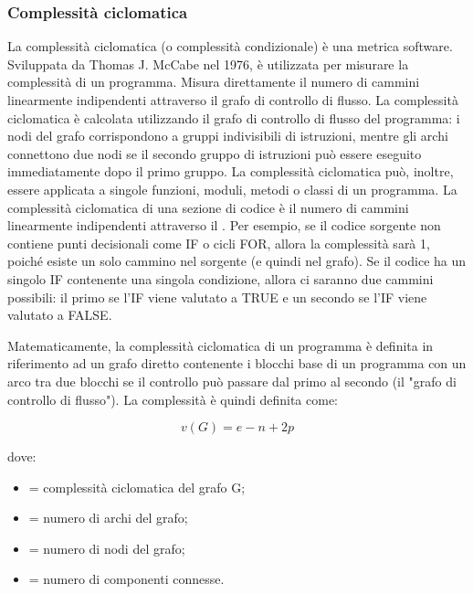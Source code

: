\subsubsection{Complessità ciclomatica}
La complessità ciclomatica (o complessità condizionale) è una metrica software. Sviluppata da Thomas J. McCabe nel 1976, è utilizzata per misurare la complessità di un programma. Misura direttamente il numero di cammini linearmente indipendenti attraverso il grafo di controllo di flusso.
La complessità ciclomatica è calcolata utilizzando il grafo di controllo di flusso del programma: i nodi del grafo corrispondono a gruppi indivisibili di istruzioni, mentre gli archi connettono due nodi se il secondo gruppo di istruzioni può essere eseguito immediatamente dopo il primo gruppo. La complessità ciclomatica può, inoltre, essere applicata a singole funzioni, moduli, metodi o classi di un programma.
La complessità ciclomatica di una sezione di codice è il numero di cammini linearmente indipendenti attraverso il . Per esempio, se il codice sorgente non contiene punti decisionali come IF o cicli FOR, allora la complessità sarà 1, poiché esiste un solo cammino nel sorgente (e quindi nel grafo). Se il codice ha un singolo IF contenente una singola condizione, allora ci saranno due cammini possibili: il primo se l'IF viene valutato a TRUE e un secondo se l'IF viene valutato a FALSE.


Matematicamente, la complessità ciclomatica di un programma è definita in riferimento ad un grafo diretto contenente i blocchi base di un programma con un arco tra due blocchi se il controllo può passare dal primo al secondo (il "grafo di controllo di flusso"). La complessità è quindi definita come:

$$v(G) = e - n + 2p$$

dove:
\begin{itemize}
\item {} = complessità ciclomatica del grafo G;
\item {} = numero di archi del grafo;
\item {} = numero di nodi del grafo;
\item {} = numero di componenti connesse.
\end{itemize}
